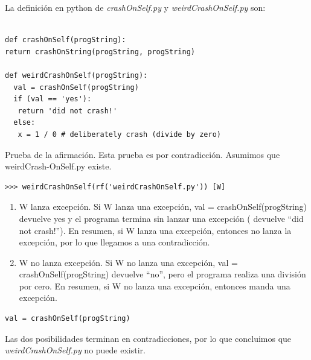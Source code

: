 \documentclass[xcolor=table]{beamer}
\begin{document}
\begin{frame} [fragile]   \small  

La definición en python de \textit{crashOnSelf.py} y  \textit{weirdCrashOnSelf.py} son:

  \begin{verbatim}

def crashOnSelf(progString):
return crashOnString(progString, progString)

def weirdCrashOnSelf(progString):
  val = crashOnSelf(progString)
  if (val == 'yes'):
   return 'did not crash!'
  else:
   x = 1 / 0 # deliberately crash (divide by zero)

\end{verbatim}    



\end{frame} 
\begin{frame} [fragile]   \small  

Prueba de la afirmación. Esta prueba es por contradicción. Asumimos que  weirdCrash-OnSelf.py existe. 

\begin{verbatim}
>>> weirdCrashOnSelf(rf('weirdCrashOnSelf.py')) [W]
\end{verbatim}    

\begin{enumerate}
    \item W lanza excepción. Si  W lanza una excepción, val = crashOnSelf(progString) devuelve yes y el programa termina sin lanzar una excepción ( devuelve  ``did not crash!”). En resumen, si W lanza una excepción, entonces no lanza la excepción, por lo que llegamos a una contradicción. 

    \item  W no lanza excepción. Si W no lanza una excepción, val = crashOnSelf(progString) devuelve ``no'', pero el programa realiza una división por cero. En resumen, si W no lanza una excepción, entonces manda una excepción.
\end{enumerate}

\begin{center}
\begin{verbatim}
val = crashOnSelf(progString)
\end{verbatim}    
\end{center}

Las dos posibilidades terminan en contradicciones, por lo que concluimos que \large \textit{weirdCrashOnSelf.py} no puede existir. 

\end{frame} 
\end{document}
